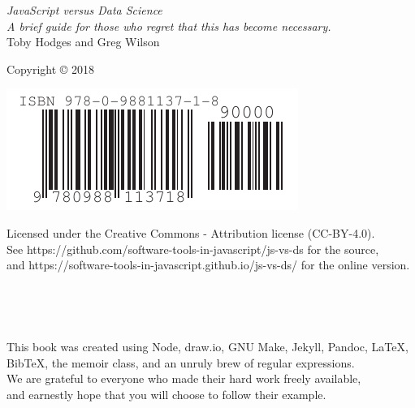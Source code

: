 \documentclass[10pt,statementpaper]{memoir}
\begin{document}
\pagestyle{empty}

{\begingroup
  \raggedleft
  \vspace*{\baselineskip}

  {\Huge\itshape JavaScript versus Data Science}\\[\baselineskip]

  {\large\itshape
    A brief guide for those who regret that this has become necessary.
  }\\[0.2\textheight]

  {\large Toby Hodges and Greg Wilson}\par

  \vfill

  {\large Copyright {\copyright} 2018}

  \vspace*{\baselineskip}

  \includegraphics{../../etc/isbn-barcode.pdf}

  \vspace*{\baselineskip}

  {\small
    Licensed under the Creative Commons - Attribution license (CC-BY-4.0).
    \\
    See https://github.com/software-tools-in-javascript/js-vs-ds for the source,\\
    and https://software-tools-in-javascript.github.io/js-vs-ds/ for the online version.
  }

\endgroup}

\newpage

\pagestyle{empty}

~

\newpage

\tableofcontents

\newpage

\pagestyle{empty}

~

\newpage

\pagestyle{plain}



\cleartoverso
{\begingroup
  \raggedleft
  \vspace*{4\baselineskip}
  This book was created using Node, draw.io, GNU Make, Jekyll, Pandoc, LaTeX, BibTeX, the memoir class,
  and an unruly brew of regular expressions. \\
  We are grateful to everyone who made their hard work freely available, \\
  and earnestly hope that you will choose to follow their example.

\endgroup}
\end{document}
